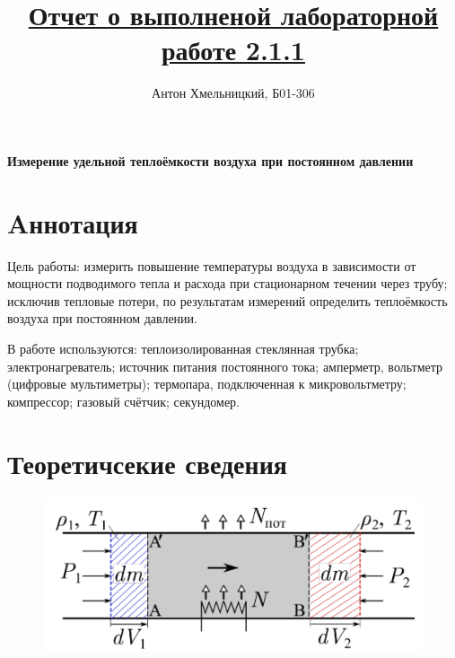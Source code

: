 \documentclass[a4paper, 12pt]{article}
\title{\underline{Отчет о выполненой лабораторной работе 2.1.1}}
\author{Антон Хмельницкий, Б01-306}
\begin{document}
\maketitle
\begin{center}
\Large{\textbf{Измерение удельной теплоёмкости воздуха при
постоянном давлении}}
\end{center}

\pagecolor{white}
\pagestyle{fancy}
\fancyhf{}
\rfoot{}

\section{Aннотация}

Цель работы: измерить повышение температуры воздуха в зависимости от мощности подводимого тепла и расхода при стационарном течении через трубу; исключив тепловые потери, по результатам измерений определить теплоёмкость воздуха при постоянном давлении.

В работе используются: теплоизолированная стеклянная трубка; электронагреватель; источник питания постоянного тока; амперметр, вольтметр (цифровые мультиметры); термопара, подключенная к микровольтметру; компрессор; газовый счётчик; секундомер.
\section{Теоретичсекие сведения}

\begin{figure}[!ht]
    \begin{center}
        \includegraphics[scale=0.7]{foto2.png}
    \caption{}
    \end{center}
\end{figure}
\end{document}
